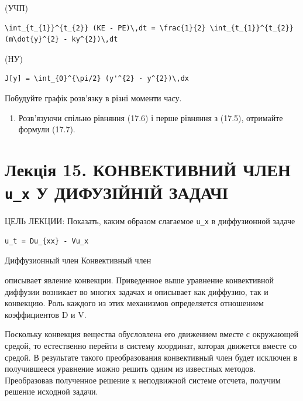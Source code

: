 \documentclass[
  ukrainian,
]{article}
\providecommand{\tightlist}{%
  \setlength{\itemsep}{0pt}\setlength{\parskip}{0pt}}
\begin{document}
(УЧП)

\begin{verbatim}
\int_{t_{1}}^{t_{2}} (KE - PE)\,dt = \frac{1}{2} \int_{t_{1}}^{t_{2}} (m\dot{y}^{2} - ky^{2})\,dt
\end{verbatim}

(НУ)

\begin{verbatim}
J[y] = \int_{0}^{\pi/2} (y'^{2} - y^{2})\,dx
\end{verbatim}

Побудуйте графік розв'язку в різні моменти часу.

\begin{enumerate}
\def\labelenumi{\arabic{enumi}.}
\setcounter{enumi}{4}
\tightlist
\item
  Розв'язуючи спільно рівняння (17.6) і перше рівняння з (17.5),
  отримайте формули (17.7).
\end{enumerate}

\section{\texorpdfstring{Лекція 15. КОНВЕКТИВНИЙ ЧЛЕН \texttt{u\_x} У
ДИФУЗІЙНІЙ
ЗАДАЧІ}{Лекція 15. КОНВЕКТИВНИЙ ЧЛЕН u\_x У ДИФУЗІЙНІЙ ЗАДАЧІ}}\label{ux43bux435ux43aux446ux456ux44f-15.-ux43aux43eux43dux432ux435ux43aux442ux438ux432ux43dux438ux439-ux447ux43bux435ux43d-u_x-ux443-ux434ux438ux444ux443ux437ux456ux439ux43dux456ux439-ux437ux430ux434ux430ux447ux456}

ЦЕЛЬ ЛЕКЦИИ: Показать, каким образом слагаемое \texttt{u\_x} в
диффузионной задаче

\begin{verbatim}
u_t = Du_{xx} - Vu_x
\end{verbatim}

Диффузионный член Конвективный член

описывает явление конвекции. Приведенное выше уравнение конвективной
диффузии возникает во многих задачах и описывает как диффузию, так и
конвекцию. Роль каждого из этих механизмов определяется отношением
коэффициентов D и V.

Поскольку конвекция вещества обусловлена его движением вместе с
окружающей средой, то естественно перейти в систему координат, которая
движется вместе со средой. В результате такого преобразования
конвективный член будет исключен в получившееся уравнение можно решить
одним из известных методов. Преобразовав полученное решение к
неподвижной системе отсчета, получим решение исходной задачи.
\end{document}
